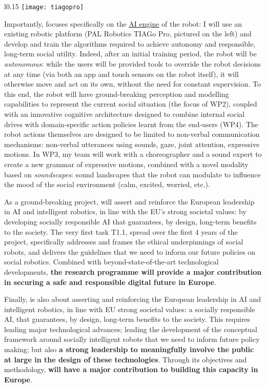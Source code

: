 \begin{wrapfigure}[11]{l}{0.15\linewidth}
    \centering
    \vspace{-10pt}
    \texttt{[image: tiagopro]}
    \label{fig|tiagopro}
\end{wrapfigure}

Importantly, \project focuses specifically on the \ul{AI engine} of the robot: I
will use an existing robotic platform (PAL Robotics TIAGo Pro, pictured on the left) and
develop and train the algorithms required to achieve autonomy and responsible,
long-term social utility. Indeed, after an initial training period, the robot
will be \emph{autonomous}: while the users will be provided tools to override
the robot decisions at any time (via both an app and touch sensors on the robot
itself), it will otherwise move and act on its own, without the need for
constant supervision. To this end, the robot will have ground-breaking
perception and modelling capabilities to represent the current social situation
(the focus of WP2), coupled with an innovative cognitive architecture designed
to combine internal social drives with domain-specific action policies learnt
from the end-users (WP4). The robot actions themselves are designed to be
limited to non-verbal communication mechanisms: non-verbal utterances using
sounds, gaze, joint attention, expressive motions. In WP3, my team will work
with a choreographer and a sound expert to create a new grammar of expressive
motions, combined with a novel modality based on \emph{soundscapes}: sound
landscapes that the robot can modulate to influence the mood of the social
environment (calm, excited, worried, etc.).

As a ground-breaking project, \project will assert and reinforce the European leadership in AI and
intelligent robotics, in line with the EU's strong societal values: by developing
socially responsible AI that guarantees, by design, long-term benefits to the
society. The very first task T1.1, spread over the first 4 years of the project,
specifically addresses and frames the ethical underpinnings of social robots,
and delivers the guidelines that we need to inform our future policies on social
robotics. Combined with beyond-state-of-the-art technological developments,
\textbf{the \project research programme will provide a major contribution in
securing a safe and responsible digital future in Europe}. 

Finally, \project is also about asserting and reinforcing the European
leadership in AI and intelligent robotics, in line with EU strong societal
values: a socially responsible AI, that guarantees, by design, long-term
benefits to the society. This requires leading major technological advances;
leading the development of the conceptual framework around socially intelligent
robots that we need to inform future policy making; but also \textbf{a strong
leadership to meaningfully involve the public at large in the design of these
technologies}. Through its objectives and methodology, \textbf{\project will
have a major contribution to building this capacity in Europe}. 


